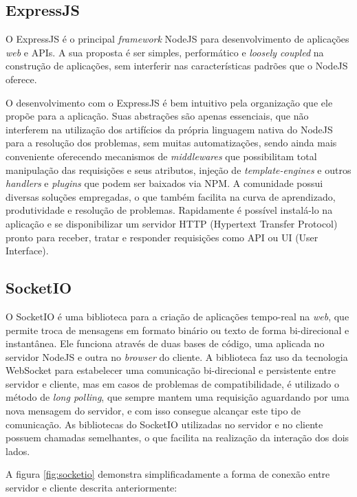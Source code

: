 \subsection{ExpressJS}
O ExpressJS \cite{expressjs} é o principal \textit{framework} NodeJS para desenvolvimento de aplicações \textit{web} e APIs. A sua proposta é ser simples, performático e \textit{loosely coupled} na construção de aplicações, sem interferir nas características padrões que o NodeJS oferece.

O desenvolvimento com o ExpressJS é bem intuitivo pela organização que ele propõe para a aplicação. Suas abstrações são apenas essenciais, que não interferem na utilização dos artifícios da própria linguagem nativa do NodeJS para a resolução dos problemas, sem muitas automatizações, sendo ainda mais conveniente oferecendo mecanismos de \textit{middlewares} que possibilitam total manipulação das requisições e seus atributos, injeção de \textit{template-engines} e outros \textit{handlers} e \textit{plugins} que podem ser baixados via NPM. A comunidade possui diversas soluções empregadas, o que também facilita na curva de aprendizado, produtividade e resolução de problemas. Rapidamente é possível instalá-lo na aplicação e se disponibilizar um servidor HTTP (Hypertext Transfer Protocol) pronto para receber, tratar e responder requisições como API ou UI (User Interface).

\subsection{SocketIO}
O SocketIO é uma biblioteca para a criação de aplicações tempo-real na \textit{web}, que permite troca de mensagens em formato binário ou texto de forma bi-direcional e instantânea. Ele funciona através de duas bases de código, uma aplicada no servidor NodeJS e outra no \textit{browser} do cliente. A biblioteca faz uso da tecnologia WebSocket para estabelecer uma comunicação bi-direcional e persistente entre servidor e cliente, mas em casos de problemas de compatibilidade, é utilizado o método de \textit{long polling}, que sempre mantem uma requisição aguardando por uma nova mensagem do servidor, e com isso consegue alcançar este tipo de comunicação. As bibliotecas do SocketIO utilizadas no servidor e no cliente possuem chamadas semelhantes, o que facilita na realização da interação dos dois lados.

A figura \ref{fig:socketio} demonstra simplificadamente a forma de conexão entre servidor e cliente descrita anteriormente:

